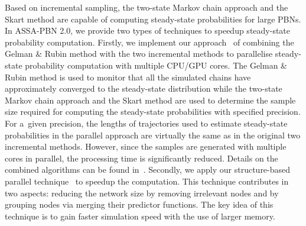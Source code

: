 \documentclass[runningheads,a4paper]{llncs}
\begin{document}
Based on incremental sampling,
the two-state Markov chain approach and the Skart method are capable of computing steady-state probabilities for large PBNs.
In {\sf ASSA-PBN} 2.0,
we provide two types of techniques to speedup steady-state probability computation.
Firstly, we implement our approach~\cite{MPY15b} of combining
the Gelman \& Rubin method with the two incremental methods
to parallelise steady-state probability computation with multiple CPU/GPU cores.
The Gelman \& Rubin method is used to monitor that all the simulated chains have approximately
converged to the steady-state distribution while the two-state Markov chain approach and the Skart method are used
to determine the sample size required for computing the steady-state probabilities with specified
precision. For a~given precision, the lengths of trajectories used to estimate steady-state
probabilities in the parallel approach are virtually the same as in the original two incremental
methods. However, since the samples are generated with multiple cores in parallel, the
processing time is significantly reduced. Details on the combined algorithms can be found
in~\cite{MPY15b}.
Secondly, we apply our structure-based parallel technique~\cite{MPY16a} to speedup the computation.
This technique contributes in two aspects: reducing the network size by removing irrelevant nodes
and by grouping nodes via merging their predictor functions. The key idea of this technique is to
gain faster simulation speed with the use of larger memory.
\end{document}
